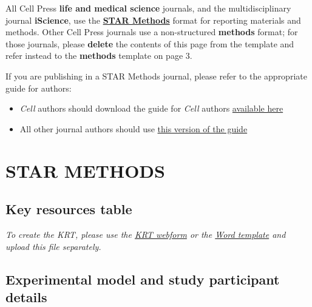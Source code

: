 \documentclass[12pt,letterpaper]{article}
\begin{document}
\newpage






All Cell Press \textbf{life and medical science} journals, and the multidisciplinary journal \textbf{iScience}, use the \textbf{\href{https://www.cell.com/star-authors-guide}{STAR Methods}} format for reporting materials and methods. Other Cell Press journals use a non-structured \textbf{methods} format; for those journals, please \textbf{delete} the contents of this page from the template and refer instead to the \textbf{methods} template on page 3.

If you are publishing in a STAR Methods journal, please refer to the appropriate guide for authors:
\begin{itemize}
\item \textit{Cell} authors should download the guide for \textit{Cell} authors \href{https://www.cell.com/pb-assets/journals/research/cell/methods/Methods_Guide_Cell-1678470557763.pdf}{available here}
\item All other journal authors should use \href{https://www.cell.com/pb-assets/journals/research/cell/methods/Methods_Guide_general-1678470557763.pdf}{this version of the guide}
\end{itemize}


\section*{STAR METHODS}


\subsection*{Key resources table}

\textit{To create the KRT, please use the \href{https://star-methods.com}{KRT webform} or the \href{http://www.cell.com/pb-assets/journals/research/cell/methods/table-template1.docx}{Word template} and upload this file separately.}

\subsection*{Experimental model and study participant details}

\end{document}
